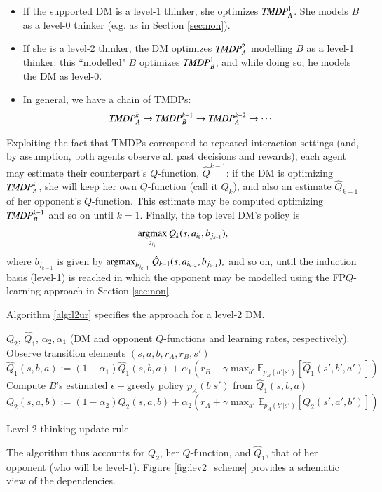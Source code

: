 \begin{itemize}
\item If the supported DM is a level-1 thinker, she optimizes  $ \emph{TMDP}_{A}^1 $. She models $B$ as a level-0 thinker
(e.g. as in Section \ref{sec:non}).
\item If she is a level-2 thinker, the DM optimizes 
$ \emph{TMDP}_{A}^2 $ modelling $B$ as a level-1 thinker:
this ``modelled" $B$ optimizes $ \emph{TMDP}_{B}^1 $, and while doing so,
he models the DM as level-0.%
\item In general, we have a chain of TMDPs:
$$ \emph{TMDP}_{A}^k \rightarrow \emph{TMDP}_{B}^{k-1}
\rightarrow \emph{TMDP}_{A}^{k-2}  \rightarrow \cdots $$
\end{itemize}
Exploiting the fact that TMDPs correspond to repeated interaction settings
(and, by assumption, both agents observe all past
decisions and rewards), each agent may  estimate their
counterpart's $Q$-function, $\hat{Q}^{k-1}$: 
if the DM is optimizing $\emph{TMDP}_A^k$, she will keep her own 
$Q$-function (call it $Q_k$), and also an estimate
$\hat{Q}_{k-1}$ of her opponent's $Q$-function. This estimate may be
computed optimizing $\emph{TMDP}_B^{k-1}$ and so on until $k=1$.
Finally, the top level DM's policy is 
\[
\operatorname*{argmax}_{a_{i_k}} Q_k(s, a_{i_k}, b_{j_{k-1}}),
\]
where $b_{j_{k-1}}$ is given by 
$
\operatorname*{argmax}_{b_{j_{k-1}}} \hat{Q}_{k-1}(s, a_{i_{k-2}}, b_{j_{k-1}}),
$ and so on, until the induction basis (level-1) is reached 
in which the opponent may be modelled using the FP$Q$-learning approach 
in Section \ref{sec:non}.

Algorithm \ref{alg:l2ur} specifies the approach 
for a level-2 DM. 

\begin{algorithm*}[!ht]
\begin{algorithmic}[1]
\Require $Q_2$, $\hat{Q}_1$, $\alpha_2, \alpha_1$ (DM and opponent $Q$-functions
and learning rates, respectively).
\State Observe  transition elements $(s, a, b, r_A, r_B, s')$ 
\State $\hat{Q}_1(s,b,a) := (1 - \alpha_1)\hat{Q}_1(s,b,a)  + \alpha_1 (r_B + \gamma \max_{b'} \mathbb{E}_{p_B(a'|s')} \left[ \hat{Q}_1(s',b', a') \right] )$ 
\State Compute $B$'s estimated $\epsilon-$greedy policy $p_A(b|s')$ from $\hat{Q}_1(s,b,a)$
\State $Q_2(s,a,b) := (1 - \alpha_2)Q_2(s,a,b) + \alpha_2 (r_A + \gamma \max_{a'} \mathbb{E}_{p_A(b'|s')} \left[ Q_2(s',a',b') \right]) $ 
\end{algorithmic}
\caption{Level-2 thinking update rule}
\label{alg:l2ur}
\end{algorithm*}
\noindent 
The algorithm thus accounts for $Q_2$,  her $Q$-function,  and $\hat{Q}_1$,
that of her
opponent (who will be level-1). Figure
\ref{fig:lev2_scheme} provides a schematic view of the dependencies.

